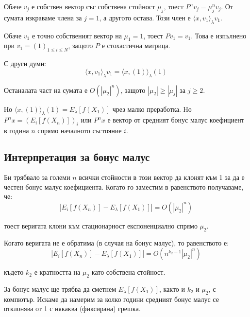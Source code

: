 \documentclass{article}
\begin{document}
Обаче $v_j$ е собствен вектор със собствена стойност $\mu_j$, тоест $P^n v_j = \mu_j^n v_j$. От сумата изкраваме члена за $j=1$, а другото остава. Този член е $\langle x,v_1 \rangle_\lambda v_1$.

Обаче $v_1$ е точно собственият вектор на $\mu_1=1$, тоест $P v_1 = v_1$. Това е изпълнено при $v_1 = (1)_{1\leq i\leq N}$, защото $P$ е стохастична матрица.

С други думи:
$$\langle x,v_1 \rangle_\lambda v_1 = \langle x,(1) \rangle_\lambda (1)$$

Останалата част на сумата е $O(|\mu_2|^n)$, защото $|\mu_2| \geq |\mu_j|$ за $j\geq2$.

Но $\langle x,(1) \rangle_\lambda (1) = E_\lambda[f(X_1)]$ чрез малко преработка. Но $P^n x = (E_i[f(X_n)])_i$ или $P^n x$ е вектор от средният бонус малус коефициент в година $n$ спрямо началното състояние $i$.

\subsection{Интерпретация за бонус малус}
Би трябвало за големи $n$ всички стойности в този вектор да клонят към 1 за да е честен бонус малус коефициента. Когато го заместим в равенството получаваме, че:
$$|E_i[f(X_n)] - E_\lambda[f(X_1)]| = O(|\mu_2|^n)$$

тоест веригата клони към стационарност експоненциално спрямо $\mu_2$.

Когато веригата не е обратима (в случая на бонус малус), то равенството е:
$$|E_i[f(X_n)] - E_\lambda[f(X_1)]| = O(n^{k_2-1}|\mu_2|^n)$$

където $k_2$ е кратността на $\mu_2$ като собствена стойност.

За бонус малус ще трябва да сметнем $E_\lambda[f(X_1)]$, както и $k_2$ и $\mu_2$, с компютър. Искаме да намерим за колко години средният бонус малус се отклонява от 1 с някаква (фиксирана) грешка.
\end{document}
